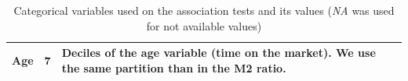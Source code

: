 \documentclass{bmcart}
\begin{document}
\begin{backmatter}
\begin{table}[h!]
{\begin{tabular}{|p{2cm}|p{1.5cm}|p{11cm}|}
			Age & 7 & Deciles of the age variable (time on the market). We use the same partition than in the M2 ratio.\\
			\hline
			
		\end{tabular}%
	}
	\caption{Categorical variables used on the association tests and its values (\textit{NA} was used for not available values) }
	\label{tab:CatVar}
\end{table}



\end{backmatter}
\end{document}
